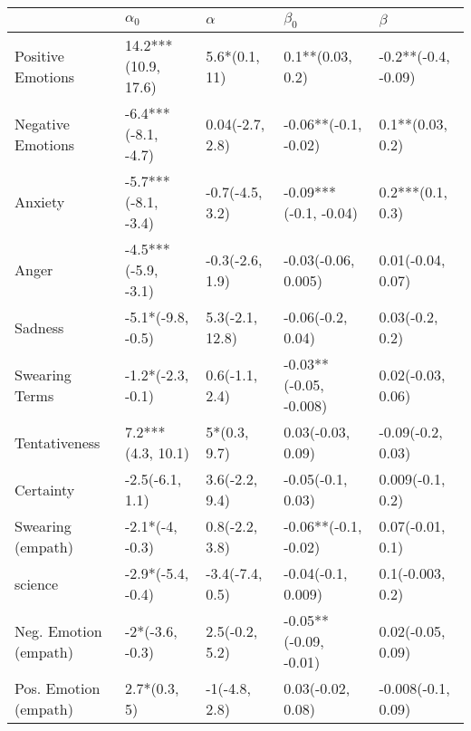 \begin{tabular}{lllll}
\toprule
{} &           $\alpha_0$ &         $\alpha$ &               $\beta_0$ &              $\beta$ \\
\midrule
Positive Emotions     &  14.2***(10.9, 17.6) &    5.6*(0.1, 11) &        0.1**(0.03, 0.2) &  -0.2**(-0.4, -0.09) \\
Negative Emotions     &  -6.4***(-8.1, -4.7) &  0.04(-2.7, 2.8) &    -0.06**(-0.1, -0.02) &     0.1**(0.03, 0.2) \\
Anxiety               &  -5.7***(-8.1, -3.4) &  -0.7(-4.5, 3.2) &   -0.09***(-0.1, -0.04) &     0.2***(0.1, 0.3) \\
Anger                 &  -4.5***(-5.9, -3.1) &  -0.3(-2.6, 1.9) &     -0.03(-0.06, 0.005) &    0.01(-0.04, 0.07) \\
Sadness               &    -5.1*(-9.8, -0.5) &  5.3(-2.1, 12.8) &       -0.06(-0.2, 0.04) &      0.03(-0.2, 0.2) \\
Swearing Terms        &    -1.2*(-2.3, -0.1) &   0.6(-1.1, 2.4) &  -0.03**(-0.05, -0.008) &    0.02(-0.03, 0.06) \\
Tentativeness         &    7.2***(4.3, 10.1) &     5*(0.3, 9.7) &       0.03(-0.03, 0.09) &    -0.09(-0.2, 0.03) \\
Certainty             &      -2.5(-6.1, 1.1) &   3.6(-2.2, 9.4) &       -0.05(-0.1, 0.03) &     0.009(-0.1, 0.2) \\
Swearing (empath)     &      -2.1*(-4, -0.3) &   0.8(-2.2, 3.8) &    -0.06**(-0.1, -0.02) &     0.07(-0.01, 0.1) \\
science               &    -2.9*(-5.4, -0.4) &  -3.4(-7.4, 0.5) &      -0.04(-0.1, 0.009) &     0.1(-0.003, 0.2) \\
Neg. Emotion (empath) &      -2*(-3.6, -0.3) &   2.5(-0.2, 5.2) &   -0.05**(-0.09, -0.01) &    0.02(-0.05, 0.09) \\
Pos. Emotion (empath) &         2.7*(0.3, 5) &    -1(-4.8, 2.8) &       0.03(-0.02, 0.08) &   -0.008(-0.1, 0.09) \\
\bottomrule
\end{tabular}
